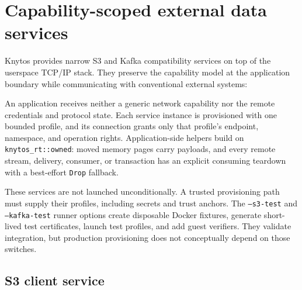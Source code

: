 \section{Capability-scoped external data services}
\label{sec:external-data-services}

Knytos provides narrow S3 and Kafka compatibility services on top of the
userspace TCP/IP stack. They preserve the capability model at the application
boundary while communicating with conventional external systems:

\begin{center}
\end{center}

An application receives neither a generic network capability nor the remote
credentials and protocol state. Each service instance is provisioned with one
bounded profile, and its connection grants only that profile's endpoint,
namespace, and operation rights. Application-side helpers build on
\texttt{knytos\_rt::owned}: moved memory pages carry payloads, and every remote
stream, delivery, consumer, or transaction has an explicit consuming teardown
with a best-effort \texttt{Drop} fallback.

These services are not launched unconditionally. A trusted provisioning path
must supply their profiles, including secrets and trust anchors. The
\texttt{--s3-test} and \texttt{--kafka-test} runner options create disposable
Docker fixtures, generate short-lived test certificates, launch test profiles,
and add guest verifiers. They validate integration, but production provisioning
does not conceptually depend on those switches.

\subsection{S3 client service}
\label{sec:s3-service}


